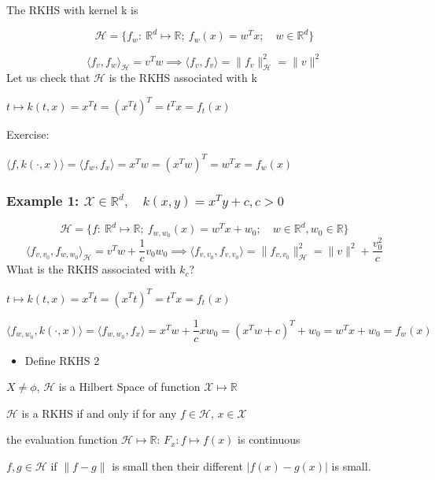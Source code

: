 \documentclass[10pt,portrait]{article}
\providecommand{\tightlist}{%
  \setlength{\itemsep}{0pt}\setlength{\parskip}{0pt}}
\begin{document}
The RKHS with kernel k is

\[\mathcal{H} = \{f_w:\ \mathbb{R}^d\mapsto\mathbb{R};\ f_w(x)=w^Tx;\quad w\in\mathbb{R}^d\}\]

\[\langle f_v,f_w\rangle_{\mathcal{H}}=v^Tw\implies\langle f_v,f_v\rangle=\|f_v\|^2_{\mathcal{H}}=\|v\|^2\]
Let us check that \(\mathcal{H}\) is the RKHS associated with k

\(t\mapsto k(t,x)=x^Tt=(x^Tt)^T=t^Tx=f_t(x)\)

Exercise:

\(\langle f,k(\cdot,x)\rangle=\langle f_w,f_x\rangle=x^Tw=(x^Tw)^T=w^Tx=f_w(x)\)

\hypertarget{example-1-mathcalxinmathbbrdquad-kxyxtycc0}{%
\subsubsection{\texorpdfstring{Example 1:
\(\mathcal{X}\in\mathbb{R}^d,\quad k(x,y)=x^Ty+c,c>0\)}{Example 1: \textbackslash{}mathcal\{X\}\textbackslash{}in\textbackslash{}mathbb\{R\}\^{}d,\textbackslash{}quad k(x,y)=x\^{}Ty+c,c\textgreater{}0}}\label{example-1-mathcalxinmathbbrdquad-kxyxtycc0}}

\[\mathcal{H} = \{f:\ \mathbb{R}^d\mapsto\mathbb{R};\ f_{w,w_0}(x)=w^Tx+w_0;\quad w\in\mathbb{R}^d,w_0\in\mathbb{R}\}\]
\[\langle f_{v,v_0},f_{w,w_0}\rangle_{\mathcal{H}}=v^Tw+\frac1cv_0w_0\implies\langle f_{v,v_0},f_{v,v_0}\rangle=\|f_{v,v_0}\|^2_{\mathcal{H}}=\|v\|^2+\frac{v_0^2}c\]
What is the RKHS associated with \(k_c\)?

\(t\mapsto k(t,x)=x^Tt=(x^Tt)^T=t^Tx=f_t(x)\)

\[\langle f_{w,w_0},k(\cdot,x)\rangle=\langle f_{w,w_0},f_x\rangle=x^Tw+\frac1cxw_0=(x^Tw+c)^T+w_0=w^Tx+w_0=f_w(x)\]

\begin{itemize}
\tightlist
\item
  Define RKHS 2
\end{itemize}

\(X\neq\phi\), \(\mathcal{H}\) is a Hilbert Space of function
\(\mathcal{X}\mapsto\mathbb{R}\)

\(\mathcal{H}\) is a RKHS if and only if for any \(f\in{\mathcal{H}}\),
\(x\in\mathcal{X}\)

the evaluation function \(\mathcal{H}\mapsto\mathbb{R}\):
\(F_x: f\mapsto f(x)\) is continuous

\(f,g\in\mathcal{H}\) if \(\|f-g\|\) is small then their different
\(|f(x)-g(x)|\) is small.
\end{document}
